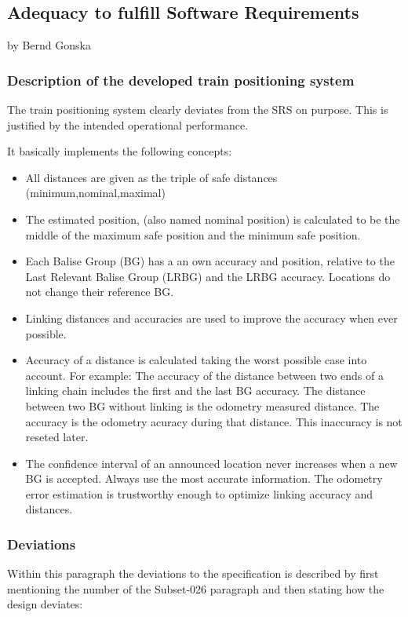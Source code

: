 \subsection{Adequacy to fulfill Software Requirements}
by Bernd Gonska

\subsubsection{Description of the developed train positioning system}
The train positioning system clearly deviates from the SRS on purpose. This is justified by the intended operational performance.

It basically implements the following concepts:
\begin{itemize}
\item All distances are given as the triple of safe distances (minimum,nominal,maximal)

\item The estimated position, (also named nominal position) is calculated to be the middle of the maximum safe position and the minimum safe position.

\item Each Balise Group (BG) has a an own accuracy and position, relative to the Last Relevant Balise Group (LRBG) and the LRBG accuracy. Locations do not change their reference BG.
  
\item Linking distances and accuracies are used to improve the accuracy when ever possible.

\item Accuracy of a distance is calculated taking the worst possible case into account. For example: The accuracy of the distance between two ends of a linking chain includes the first and the last BG accuracy. The distance between two BG without linking is the odometry measured distance. The accuracy is the odometry acuracy during that distance. This inaccuracy is not reseted later.

\item The confidence interval of an announced location never increases when a new BG is accepted. Always use the most accurate information. The odometry error estimation is trustworthy enough to optimize linking accuracy and distances.
\end{itemize}

\subsubsection{Deviations}
Within this paragraph the deviations to the specification is described by first mentioning the number of the Subset-026 paragraph  and then stating how the design deviates:

